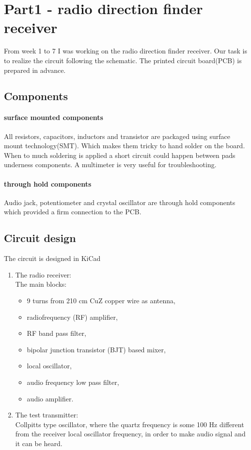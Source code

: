 \documentclass[
11pt, %
a4paper, %
oneside, %
headinclude,footinclude, %
BCOR5mm, %
]{scrartcl}
\begin{document}

\newpage %

\section{Part1 - radio direction finder receiver}

From week 1 to 7 I was working on the radio direction finder receiver. Our task is to realize
the circuit following the schematic. The printed circuit board(PCB) is prepared in advance.

\subsection{Components}
\paragraph{surface mounted components}
All resistors, capacitors, inductors and transistor are packaged using surface mount technology(SMT).
Which makes them tricky to hand solder on the board. When to much soldering is applied
a short circuit could happen between pads underness components. A multimeter is very useful
for troubleshooting.

\paragraph{through hold components}
Audio jack, potentiometer and crystal oscillator are through hold components which provided
a firm connection to the PCB.

\subsection{Circuit design}
The circuit is designed in KiCad

\begin{enumerate}
\item
The radio receiver:\\
	The main blocks:
	\begin{itemize}
	\item 9 turns from 210 cm CuZ copper wire as antenna,
	\item radiofrequency (RF) amplifier,
	\item RF band pass filter,
	\item bipolar junction transistor (BJT) based mixer,
	\item local oscillator,
	\item audio frequency low pass filter,
	\item audio amplifier.
	\end{itemize}
\item
The test transmitter:\\
	Collpitts type oscillator, where the quartz frequency is some 100 Hz
    different from the receiver local oscillator frequency,
    in order to make audio signal and it can be heard.
\end{enumerate}
\end{document}
